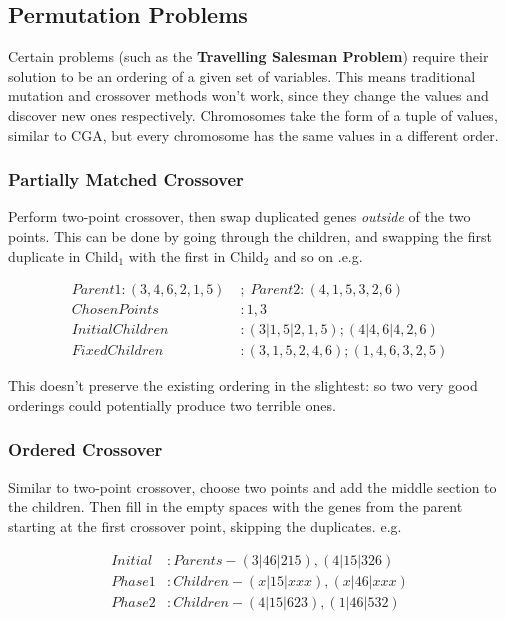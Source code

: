 \subsection{Permutation Problems}
Certain problems (such as the \textbf{Travelling Salesman Problem}) require their solution to be an ordering of a given set of variables. This means traditional mutation and crossover methods won't work, since they change the values and discover new ones respectively. Chromosomes take the form of a tuple of values, similar to CGA, but every chromosome has the same values in a different order.



\subsubsection{Partially Matched Crossover}
Perform two-point crossover, then swap duplicated genes \emph{outside} of the two points. This can be done by going through the children, and swapping the first duplicate in Child$_1$ with the first in Child$_2$ and so on .e.g.

\begin{align}
    Parent 1: (3,4,6,2,1,5)\; &; \;  Parent 2: (4,1,5,3,2,6) \nonumber \\
    Chosen Points&: 1, 3 \nonumber \\
    Initial Children&: (3|1,5|2,1,5); (4|4,6|4,2,6) \nonumber \\
    Fixed Children&: (3,1,5,2,4,6); (1,4,6,3,2,5) \nonumber 
\end{align}

This doesn't preserve the existing ordering in the slightest: so two very good orderings could potentially produce two terrible ones. 

\subsubsection{Ordered Crossover}
Similar to two-point crossover, choose two points and add the middle section to the children. Then fill in the empty spaces with the genes from the parent starting at the first crossover point, skipping the duplicates. e.g.

\begin{align}
    Initial &: Parents - (3|46|215), (4|15|326) \nonumber \\
    Phase 1 &: Children - (x|15|xxx), (x|46|xxx) \nonumber \\
    Phase 2 &: Children - (4|15|623), (1|46|532) \nonumber 
\end{align}

